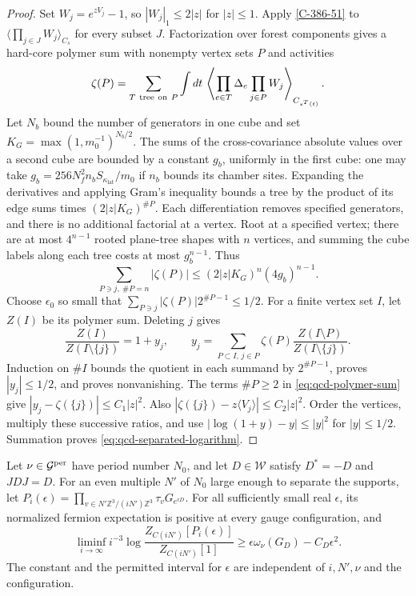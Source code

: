 \documentclass[11pt,letterpaper,reqno]{amsart}
\makeatletter
\theoremstyle{definition}
\newcommand{\ms@minorstart}{%
  \pushQED{\qed}\renewcommand{\qedsymbol}{$\blacksquare$}}
\newenvironment{proposition}[1][]{\ms@minorstart\ms@proposition[#1]}
  {\popQED\endms@proposition}
\theoremstyle{remark}
\makeatother
\begin{document}
\begin{proof}
Set $W_j=e^{zV_j}-1$, so $|W_j|_1\le2|z|$ for $|z|\le1$.
Apply \eqref{C-386-51} to
$\langle\prod_{j\in J}W_j\rangle_{C_s}$ for every subset $J$.
Factorization over forest components gives a hard-core polymer
sum with nonempty vertex sets $P$ and activities
\[
 \zeta(P)=\sum_{T\ {\rm tree\ on}\ P}\int dt\,
     \left\langle\prod_{e\in T}\Delta_e\prod_{j\in P}W_j
                                  \right\rangle_{C_{s^T(t)}}.
\]
Let $N_b$ bound the number of generators in one cube and set
$K_G=\max(1,m_0^{-1})^{N_b/2}$.
The sums of the cross-covariance absolute values over a second
cube are bounded by a constant $g_b$, uniformly in the first
cube: one may take $g_b=256N_f^2n_bS_{\kappa_{\mathrm{lat}}}/m_0$ if $n_b$
bounds its chamber sites. Expanding the derivatives and applying
Gram's inequality bounds a tree by the product of its edge sums
times $(2|z|K_G)^{\#P}$. Each differentiation removes specified
generators, and there is no additional factorial at a vertex.
Root at a specified vertex; there are at most $4^{n-1}$ rooted
plane-tree shapes with $n$ vertices, and summing the cube labels
along each tree costs at most $g_b^{n-1}$. Thus
\begin{equation}\label{eq:qcd-polymer-sum}
 \sum_{P\ni j,\ \#P=n}|\zeta(P)|
                      \le(2|z|K_G)^n(4g_b)^{n-1}.
\end{equation}
Choose $\epsilon_0$ so small that
$\sum_{P\ni j}|\zeta(P)|2^{\#P-1}\le1/2$.
For a finite vertex set $I$, let $Z(I)$ be its polymer sum.
Deleting $j$ gives
\[
 \frac{Z(I)}{Z(I\setminus\{j\})}=1+y_j,
 \qquad
 y_j=\sum_{P\subset I,\,j\in P}
             \zeta(P)\frac{Z(I\setminus P)}{Z(I\setminus\{j\})}.
\]
Induction on $\#I$ bounds the quotient in each summand by
$2^{\#P-1}$, proves $|y_j|\le1/2$, and proves nonvanishing.
The terms $\#P\ge2$ in \eqref{eq:qcd-polymer-sum} give
$|y_j-\zeta(\{j\})|\le C_1|z|^2$.
Also $|\zeta(\{j\})-z\langle V_j\rangle|\le C_2|z|^2$.
Order the vertices, multiply these successive ratios, and use
$|\log(1+y)-y|\le|y|^2$ for $|y|\le1/2$.
Summation proves \eqref{eq:qcd-separated-logarithm}.
\end{proof}

\begin{proposition}[The lower tangent for insertions]\label{C-386-52}
Let $\nu\in\mathcal G^{\rm per}$ have period number $N_0$,
and let $D\in\mathcal W$ satisfy $D^*=-D$ and $JDJ=D$.
For an even multiple $N'$ of $N_0$ large enough to separate
the supports, let
$P_i(\epsilon)=\prod_{v\in N'\mathbb Z^3/(iN')\mathbb Z^3}
                         \tau_vG_{e^{\epsilon D}}$.
For all sufficiently small real $\epsilon$, its normalized
fermion expectation is positive at every gauge configuration,
and
\[
 \liminf_{i\to\infty}i^{-3}
       \log\frac{Z_{C(iN')}[P_i(\epsilon)]}{Z_{C(iN')}[1]}
                  \ge\epsilon\omega_\nu(G_D)-C_D\epsilon^2.
\]
The constant and the permitted interval for $\epsilon$ are
independent of $i,N',\nu$ and the configuration.
\end{proposition}
\end{document}
